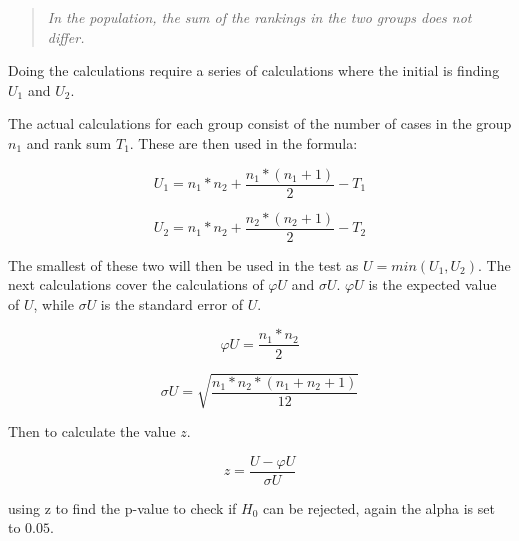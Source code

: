 \begin{quote}
    \textit{In the population, the sum of the rankings in the two groups does not differ.}
\end{quote}

Doing the calculations require a series of calculations where the initial is finding $U_1$ and $U_2$.

The actual calculations for each group consist of the number of cases in the group $n_1$ and rank sum $T_1$. These are then used in the formula:

\begin{equation}
    U_1 = n_1*n_2+\frac{n_1*(n_1+1)}{2}-T_1  
\end{equation}

\begin{equation}
    U_2 = n_1*n_2+\frac{n_2*(n_2+1)}{2}-T_2
\end{equation}

The smallest of these two will then be used in the test as $U=min(U_1,U_2)$. The next calculations cover the calculations of $\varphi U$ and $\sigma U$. $\varphi U$ is the expected value of $U$, while $\sigma U$ is the standard error of $U$.

\begin{equation}
    \varphi U = \frac{n_1*n_2}{2}
\end{equation}

\begin{equation}
    \sigma U = \sqrt{\frac{n_1*n_2*(n_1+n_2+1)}{12}}
\end{equation}

Then to calculate the value $z$.

\begin{equation}
    z = \frac{U-\varphi U}{\sigma U}
\end{equation}

using z to find the p-value to check if $H_0$ can be rejected, again the alpha is set to $0.05$. 

